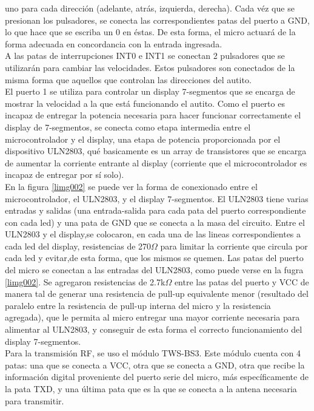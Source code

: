 \documentclass[a4paper,10pt]{article}
\begin{document}
			uno para cada dirección (adelante, atrás, izquierda, derecha). Cada véz que se presionan los pulsadores, se conecta las correspondientes patas del 
			puerto a GND, lo que hace que se escriba un 0 en éstas. De esta forma, el micro actuará de la forma adecuada en concordancia con la entrada 
			ingresada. \\
			\indent A las patas de interrupciones INT0 e INT1 se conectan 2 pulsadores que se utilizarán para cambiar las velocidades. Estos pulsadores son 
			conectados de la misma forma que aquellos que controlan las direcciones del autito.\\
			\indent El puerto 1 se utiliza para controlar un display 7-segmentos que se encarga de mostrar la velocidad a la que está funcionando el autito. 
			Como el puerto es incapaz de entregar la potencia necesaria para hacer funcionar correctamente el display de 7-segmentos, se conecta como etapa 
			intermedia entre el microcontrolador y el display, una etapa de potencia proporcionada por el dispositivo ULN2803, qué basicamente es un array 
			de transistores que se encarga de aumentar la corriente entrante al display (corriente que el microcontrolador es incapaz de entregar por sí solo). \\
			\indent En la figura \ref{limg002} se puede ver la forma de conexionado entre el microcontrolador, el ULN2803, y el display 7-segmentos. El ULN2803 
			tiene varias entradas y salidas (una entrada-salida para cada pata del puerto correspondiente con cada led) y una pata de GND que se conecta a la 
			masa del circuito. Entre el ULN2803 y el display,se colocaron, en cada una de las lineas correspondientes a cada led del display, resistencias de 
			270$\Omega$ para limitar la corriente que circula por cada led y evitar,de esta forma, que los mismos se quemen. Las patas del puerto del micro se
			conectan a las entradas del ULN2803, como puede verse en la fugra \ref{limg002}. Se agregaron resistencias de 2.7k$\Omega$ entre las patas del puerto 
			y VCC de manera tal de generar una resistencia de pull-up equivalente menor (resultado del paralelo entre la resistencia de pull-up interna del micro 
			y la resistencia agregada), que le permita al micro entregar una mayor corriente necesaria para alimentar al ULN2803, y conseguir de esta forma el 
			correcto funcionamiento del display 7-segmentos. \\
			\indent Para la transmisión RF, se uso el módulo TWS-BS3. Este módulo cuenta con 4 patas: una que se conecta a VCC, otra que se conecta a GND, otra 
			que recibe la información digital proveniente del puerto serie del micro, más específicamente de la pata TXD, y una última pata que es la que se 
			conecta a la antena necesaria para transmitir.\\
			
\end{document}
